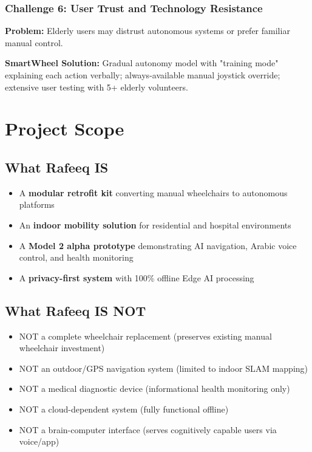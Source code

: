 \documentclass[12pt,a4paper]{report}
\begin{document}
\subsubsection{Challenge 6: User Trust and Technology Resistance}

\textbf{Problem:} Elderly users may distrust autonomous systems or prefer familiar manual control.

\textbf{SmartWheel Solution:} Gradual autonomy model with "training mode" explaining each action verbally; always-available manual joystick override; extensive user testing with 5+ elderly volunteers.

\section{Project Scope}

\subsection{What Rafeeq IS}

\begin{itemize}[leftmargin=*,itemsep=5pt]
    \item A \textbf{modular retrofit kit} converting manual wheelchairs to autonomous platforms
    \item An \textbf{indoor mobility solution} for residential and hospital environments
    \item A \textbf{Model 2 alpha prototype} demonstrating AI navigation, Arabic voice control, and health monitoring
    \item A \textbf{privacy-first system} with 100\% offline Edge AI processing
\end{itemize}

\subsection{What Rafeeq IS NOT}

\begin{itemize}[leftmargin=*,itemsep=5pt]
    \item NOT a complete wheelchair replacement (preserves existing manual wheelchair investment)
    \item NOT an outdoor/GPS navigation system (limited to indoor SLAM mapping)
    \item NOT a medical diagnostic device (informational health monitoring only)
    \item NOT a cloud-dependent system (fully functional offline)
    \item NOT a brain-computer interface (serves cognitively capable users via voice/app)
\end{itemize}
\end{document}
